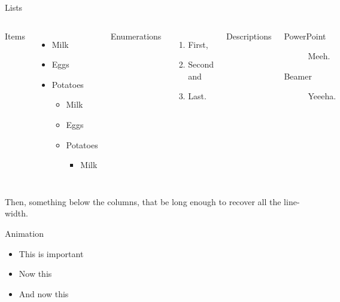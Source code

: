 \documentclass[aspectratio=169]{beamer}
\begin{document}
	\begin{frame}{Lists}
		\begin{columns}[T,onlytextwidth]
				Items
				\begin{itemize}
		  			\item Milk \item Eggs \item Potatoes
					\begin{itemize}
						\item Milk \item Eggs \item Potatoes
						\begin{itemize}
							\item Milk
						 \end{itemize}
				 	\end{itemize}
				\end{itemize}
			
				Enumerations
				\begin{enumerate}
		  			\item First, \item Second and \item Last.
				\end{enumerate}
			
				Descriptions
				\begin{description}
		  			\item[PowerPoint] Meeh. \item[Beamer] Yeeeha.
				\end{description}
		\end{columns}
		
		\vspace{2em}
		Then, something below the columns, that be long enough to recover all the line-width.
	\end{frame}
	
	\begin{frame}{Animation}
		\begin{itemize}[<+- | alert@+>]
			\item \alert<4>{This is important}
			\item Now this
			\item And now this
		\end{itemize}
	\end{frame}
\end{document}
